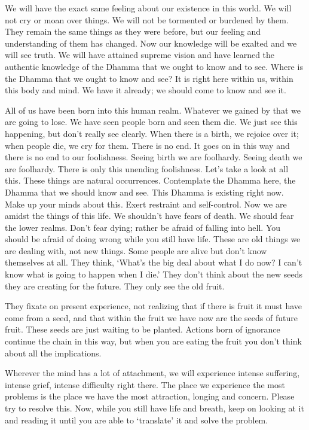 We will have the exact same feeling about our existence in this world. We will not cry or moan over things. We will not be tormented or burdened by them. They remain the same things as they were before, but our feeling and understanding of them has changed. Now our knowledge will be exalted and we will see truth. We will have attained supreme vision and have learned the authentic knowledge of the Dhamma that we ought to know and to see. Where is the Dhamma that we ought to know and see? It is right here within us, within this body and mind. We have it already; we should come to know and see it. 

All of us have been born into this human realm. Whatever we gained by that we are going to lose. We have seen people born and seen them die. We just see this happening, but don't really see clearly. When there is a birth, we rejoice over it; when people die, we cry for them. There is no end. It goes on in this way and there is no end to our foolishness. Seeing birth we are foolhardy. Seeing death we are foolhardy. There is only this unending foolishness. Let's take a look at all this. These things are natural occurrences. Contemplate the Dhamma here, the Dhamma that we should know and see. This Dhamma is existing right now. Make up your minds about this. Exert restraint and self-control. Now we are amidst the things of this life. We shouldn't have fears of death. We should fear the lower realms. Don't fear dying; rather be afraid of falling into hell. You should be afraid of doing wrong while you still have life. These are old things we are dealing with, not new things. Some people are alive but don't know themselves at all. They think, `What's the big deal about what I do now? I can't know what is going to happen when I die.' They don't think about the new seeds they are creating for the future. They only see the old fruit.

They fixate on present experience, not realizing that if there is fruit it must have come from a seed, and that within the fruit we have now are the seeds of future fruit. These seeds are just waiting to be planted. Actions born of ignorance continue the chain in this way, but when you are eating the fruit you don't think about all the implications. 

Wherever the mind has a lot of attachment, we will experience intense suffering, intense grief, intense difficulty right there. The place we experience the most problems is the place we have the most attraction, longing and concern. Please try to resolve this. Now, while you still have life and breath, keep on looking at it and reading it until you are able to `translate' it and solve the problem. 

